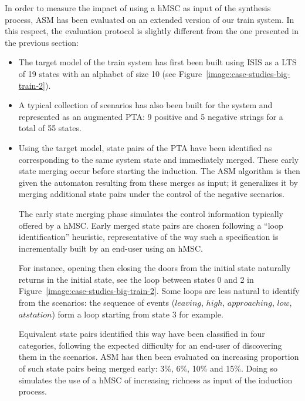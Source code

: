 In order to measure the impact of using a hMSC as input of the synthesis process, ASM has been evaluated on an extended version of our train system. In this respect, the evaluation protocol is slightly different from the one presented in the previous section: 
\begin{itemize}

\item The target model of the train system has first been built using ISIS as a LTS of 19 states with an alphabet of size 10 (see Figure~\ref{image:case-studies-big-train-2}). 

\item A typical collection of scenarios has also been built for the system and represented as an augmented PTA: 9 positive and 5 negative strings for a total of 55 states.

\item Using the target model, state pairs of the PTA have been identified as corresponding to the same system state and immediately merged. These early state merging occur before starting the induction. The ASM algorithm is then given the automaton resulting from these merges as input; it generalizes it by merging additional state pairs under the control of the negative scenarios.

The early state merging phase simulates the control information typically offered by a hMSC. Early merged state pairs are chosen following a ``loop identification'' heuristic, representative of the way such a specification is incrementally built by an end-user using an hMSC. 

For instance, opening then closing the doors from the initial state naturally returns in the initial state, see the loop between states 0 and 2 in Figure~\ref{image:case-studies-big-train-2}. Some loops are less natural to identify from the scenarios: the sequence of events ($leaving$, $high$, $approaching$, $low$, $at station$) form a loop starting from state 3 for example. 

Equivalent state pairs identified this way have been classified in four categories, following the expected difficulty for an end-user of discovering them in the scenarios. ASM has then been evaluated on increasing proportion of such state pairs being merged early: 3\%, 6\%, 10\% and 15\%. Doing so simulates the use of a hMSC of increasing richness as input of the induction process. 
\end{itemize}

